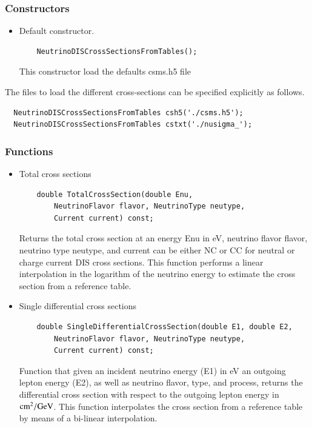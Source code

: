 \documentclass[3p,12pt]{elsarticle}
\newcommand{\ttf}{\ttfamily}
\begin{document}
\subsubsection{Constructors}

\begin{itemize}
\item Default constructor.
  \begin{lstlisting}
    NeutrinoDISCrossSectionsFromTables();
  \end{lstlisting}
  This constructor load the defaults {\ttf csms.h5} file
\end{itemize}

The files to load the different cross-sections can be specified
explicitly as follows. 
\begin{lstlisting}
  NeutrinoDISCrossSectionsFromTables csh5('./csms.h5');
  NeutrinoDISCrossSectionsFromTables cstxt('./nusigma_');
\end{lstlisting}

\subsubsection{Functions}

\begin{itemize}
\item Total cross sections
  \begin{lstlisting}
    double TotalCrossSection(double Enu,
    	NeutrinoFlavor flavor, NeutrinoType neutype,
    	Current current) const;
      \end{lstlisting}
      
  Returns the total cross section at an energy {\ttf Enu} in eV, neutrino
  flavor {\ttf flavor}, neutrino type {\ttf neutype}, and {\ttf
    current} can be either {\ttf NC} or {\ttf CC} for neutral or
  charge current DIS cross sections. This function performs a linear interpolation in
  the logarithm of the neutrino energy to estimate the cross section from a reference table.
     
\item Single differential cross sections              
  \begin{lstlisting}
    double SingleDifferentialCrossSection(double E1, double E2,
    	NeutrinoFlavor flavor, NeutrinoType neutype,
    	Current current) const;
  \end{lstlisting}
      Function that given an incident neutrino energy ({\ttf E1}) in eV an outgoing lepton energy ({\ttf E2}), as well as neutrino flavor,
       type, and process, returns the differential cross section with
       respect to the outgoing lepton energy in ${\rm cm}^2/{\rm
         GeV}$. This function interpolates the cross section from a reference table by means of a bi-linear interpolation.
\end{itemize}
\end{document}
